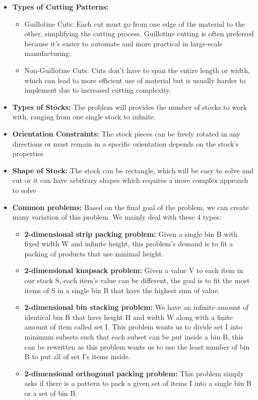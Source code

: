 \documentclass[a4paper]{article}
\begin{document}
\begin{itemize}
    \item \textbf{Types of Cutting Patterns:}
    \begin{itemize}
    \item Guillotine Cuts: Each cut must go from one edge of the material to the other, simplifying the cutting process. Guillotine cutting is often preferred because it's easier to automate and more practical in large-scale manufacturing.
    \item Non-Guillotine Cuts: Cuts don’t have to span the entire length or width, which can lead to more efficient use of material but is usually harder to implement due to increased cutting complexity.
\end{itemize}
\item \textbf{Types of Stocks:}
The problem will provides the number of stocks to work with, ranging from one single stock to infinite.
\item \textbf{Orientation Constraints:}
The stock pieces can be freely rotated in any directions or must remain in a specific orientation depends on the stock's properties
\item \textbf{Shape of Stock:} The stock can be rectangle, which will be easy to solve and cut or it can have arbitrary shapes which requires a more complex approach to solve

\item \textbf{Common problems:} Based on the final goal of the problem, we can create many variation of this problem. We mainly deal with these 4 types:
\begin{itemize}
    \item \textbf{2-dimensional strip packing problem:} Given a single bin B with fixed width W and infinite height, this problem's demand is to fit a packing of products that use minimal height.
    \item \textbf{2-dimensional knapsack problem:} Given a value V to each item in our stock S, each item's value can be different, the goal is to fit the most items of S in a single bin B that have the highest sum of value.
    \item \textbf{2-dimensional bin stacking problem:} We have an infinite amount of identical bin B that have height H and width W along with a finite amount of item called set I. This problem wants us to divide set I into minimum subsets such that each subset can be put inside a bin B, this can be rewritten as this problem wants us to use the least number of bin B to put all of set I's items inside.
    \item \textbf{2-dimensional orthogonal packing problem:} This problem simply asks if there is a pattern to pack a given set of items I into a single bin B or a set of bin B. 
\end{itemize}

\end{itemize}
\end{document}
